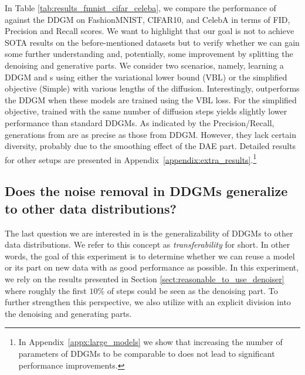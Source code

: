 In Table \ref{tab:results_fmnist_cifar_celeba}, we compare the performance of \ours{} against the DDGM on FashionMNIST, CIFAR10, and CelebA in terms of FID, Precision and Recall scores. We want to highlight that our goal is not to achieve SOTA results on the before-mentioned datasets but to verify whether we can gain some further understanding and, potentially, some improvement by splitting the denoising and generative parts. We consider two scenarios, namely, learning a DDGM and \ours{}s using either the variational lower bound (VBL) or the simplified objective (Simple) with various lengths of the diffusion. Interestingly, \ours{} outperforms the DDGM when these models are trained using the VBL loss. For the simplified objective, \ours{} trained with the same number of diffusion steps yields slightly lower performance than standard DDGMs. As indicated by the Precision/Recall, generations from \ours{} are as precise as those from DDGM. However, they lack certain diversity, probably due to the smoothing effect of the DAE part. Detailed results for other setups are presented in Appendix~\ref{appendix:extra_results}.\footnote{In Appendix~\ref{appx:large_models} we show that increasing the number of parameters of DDGMs to be comparable to \ours{} does not lead to significant performance improvements.}

\subsection{Does the noise removal in DDGMs generalize to other data distributions?}
The last question we are interested in is the generalizability of DDGMs to other data distributions. We refer to this concept as \textit{transferability} for short. In other words, the goal of this experiment is to determine whether we can reuse a model or its part on new data with as good performance as possible. In this experiment, we rely on the results presented in Section \ref{sect:reasonable_to_use_denoiser} where roughly the first $10\%$ of steps could be seen as the denoising part. To further strengthen this perspective, we also utilize \ours{} with an explicit division into the denoising and generating parts.


